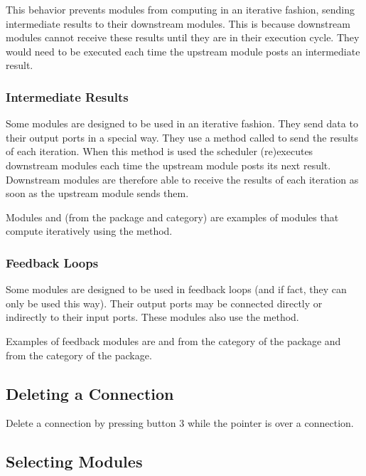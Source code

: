 This behavior prevents modules from computing in an iterative fashion,
sending intermediate results to their downstream modules.  This is because
downstream modules cannot receive these results until they are in their
execution cycle.  They would need to be executed each time the
upstream module posts an intermediate result.


\subsubsection{Intermediate Results}

Some modules are designed to be used in an iterative fashion.  They send
data to their output ports in a special way.  They use a method called
 to send the results of each iteration.  When
this method is used the scheduler (re)executes downstream modules each time
the upstream module posts its next result.  Downstream modules are
therefore able to receive the results of each iteration as soon as the
upstream module sends them.

Modules  and  (from the
\package{\sr} package and  category) are examples of modules
that compute iteratively using the  method.

\subsubsection{Feedback Loops}

Some modules are designed to be used in feedback loops (and if fact,
they can only be used this way).  Their output ports may be connected
directly or indirectly to their input ports.  These modules also use the
 method.

Examples of feedback modules are  and
 from the  category of the
 package and  from the
 category of the  package.

\subsection{Deleting a Connection}
\label{sec:deleteconnections}

Delete a connection by pressing button 3 while the pointer is
over a connection.

\subsection{Selecting Modules}
\label{sec:selectmods}

